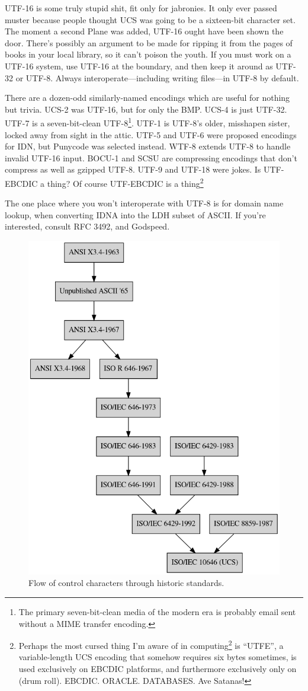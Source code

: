 UTF-16 is some truly stupid shit, fit only for jabronies. It only ever passed
muster because people thought UCS was going to be a sixteen-bit character set.
The moment a second Plane was added, UTF-16 ought have been shown the door.
There's possibly an argument to be made for ripping it from the pages of books
in your local library, so it can't poison the youth. If you must work on a UTF-16
system, use UTF-16 at the boundary, and then keep it around as UTF-32 or UTF-8.
Always interoperate---including writing files---in UTF-8 by default.

There are a dozen-odd similarly-named encodings which are useful for nothing
but trivia. UCS-2 was UTF-16, but for only the BMP. UCS-4 is just UTF-32. UTF-7
is a seven-bit-clean UTF-8\footnote{The primary seven-bit-clean media of the
modern era is probably email sent without a MIME transfer encoding.}. UTF-1 is UTF-8's older, misshapen sister, locked away from
sight in the attic. UTF-5 and UTF-6 were proposed encodings for IDN, but
Punycode was selected instead. WTF-8 extends UTF-8 to handle invalid UTF-16
input. BOCU-1 and SCSU are compressing encodings that
don't compress as well as gzipped UTF-8. UTF-9 and UTF-18 were jokes. Is
UTF-EBCDIC a thing? Of course UTF-EBCDIC is a thing\footnote{Perhaps the
most cursed thing I'm aware of in computing\footnote{Also receiving votes:
Threaded INTERCAL, sendmail configuration files, old-skool XFree86
configuration files with the modeline bullshit, ActiveX controls, ``WebNFS'', and of course
Perl.} is ``UTFE'', a variable-length
UCS encoding that somehow requires six bytes sometimes, is used exclusively
on EBCDIC platforms, and furthermore exclusively only on (drum roll)\textellipsis.
EBCDIC. ORACLE. DATABASES. Ave Satanas!}

The one place where you won't interoperate with UTF-8 is for domain name lookup,
when converting IDNA into the LDH subset of ASCII. If you're interested,
consult RFC 3492, and Godspeed.

\begin{figure}[!htb]
    \centering
    \includegraphics[width=.75\linewidth]{media/control-char-standards.png}
    \caption{Flow of control characters through historic standards.}
\end{figure}

\cleardoublepage

